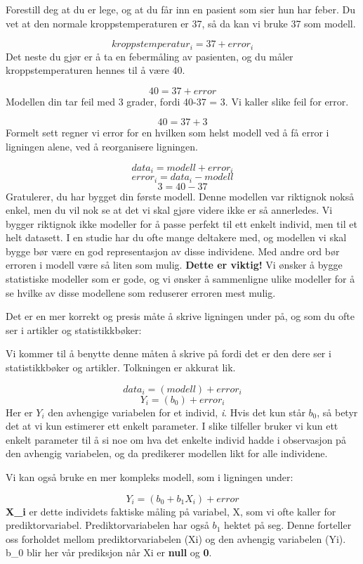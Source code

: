 \documentclass[
]{book}
\begin{document}
Forestill deg at du er lege, og at du får inn en pasient som sier hun har feber. Du vet at den normale kroppstemperaturen er 37, så da kan vi bruke 37 som modell.

\[
kroppstemperatur_i = 37 + error_i
\]
Det neste du gjør er å ta en febermåling av pasienten, og du måler kroppstemperaturen hennes til å være 40.

\[
40 = 37 + error
\]
Modellen din tar feil med 3 grader, fordi 40-37 = 3. Vi kaller slike feil for error.

\[
40 = 37 + 3
\]
Formelt sett regner vi error for en hvilken som helst modell ved å få error i ligningen alene, ved å reorganisere ligningen.

\[
data_i = modell + error_i
\]
\[
error_i = data_i - modell
\]
\[
3 = 40 - 37
\]
Gratulerer, du har bygget din første modell. Denne modellen var riktignok nokså enkel, men du vil nok se at det vi skal gjøre videre ikke er så annerledes. Vi bygger riktignok ikke modeller for å passe perfekt til ett enkelt individ, men til et helt datasett. I en studie har du ofte mange deltakere med, og modellen vi skal bygge bør være en god representasjon av disse individene. Med andre ord bør erroren i modell være så liten som mulig. \textbf{Dette er viktig!} Vi ønsker å bygge statistiske modeller som er gode, og vi ønsker å sammenligne ulike modeller for å se hvilke av disse modellene som reduserer erroren mest mulig.

Det er en mer korrekt og presis måte å skrive ligningen under på, og som du ofte ser i artikler og statistikkbøker:

Vi kommer til å benytte denne måten å skrive på fordi det er den dere ser i statistikkbøker og artikler. Tolkningen er akkurat lik.

\[
data_i = (modell) + error_i
\]
\[
Y_i = (b_0) + error_i
\]
Her er \(Y_i\) den avhengige variabelen for et individ, \emph{i}. Hvis det kun står \(b_0\), så betyr det at vi kun estimerer ett enkelt parameter. I slike tilfeller bruker vi kun ett enkelt parameter til å si noe om hva det enkelte individ hadde i observasjon på den avhengig variabelen, og da predikerer modellen likt for alle individene.

Vi kan også bruke en mer kompleks modell, som i ligningen under:

\[
Y_i = (b_0 + b_1X_i) + error
\]
\textbf{X\_i} er dette individets faktiske måling på variabel, X, som vi ofte kaller for prediktorvariabel. Prediktorvariabelen har også \(b_1\) hektet på seg. Denne forteller oss forholdet mellom prediktorvariabelen (Xi) og den avhengig variabelen (Yi). b\_0 blir her vår prediksjon når Xi er \textbf{null} og \textbf{0}.
\end{document}
